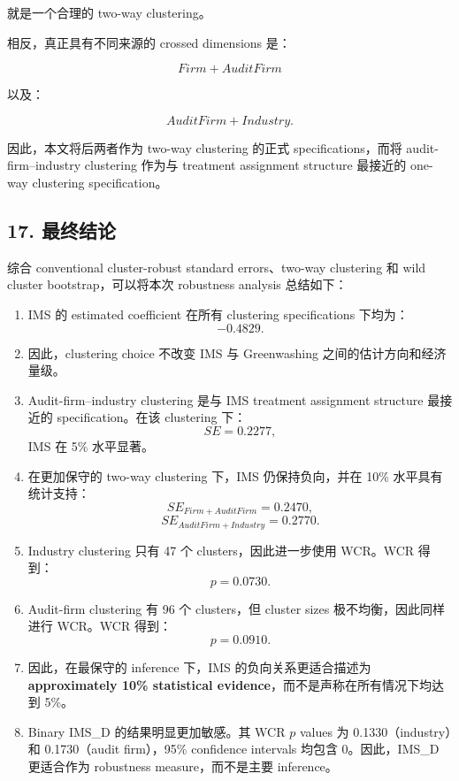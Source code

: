 \documentclass[11pt]{article}
\begin{document}
就是一个合理的 two-way clustering。

相反，真正具有不同来源的 crossed dimensions 是：

\[
Firm + AuditFirm
\]

以及：

\[
AuditFirm + Industry.
\]

因此，本文将后两者作为 two-way clustering 的正式 specifications，而将 audit-firm--industry clustering 作为与 treatment assignment structure 最接近的 one-way clustering specification。

\subsection{17. 最终结论}

综合 conventional cluster-robust standard errors、two-way clustering 和 wild cluster bootstrap，可以将本次 robustness analysis 总结如下：

\begin{enumerate}
    \item IMS 的 estimated coefficient 在所有 clustering specifications 下均为：
    \[
    -0.4829.
    \]

    \item 因此，clustering choice 不改变 IMS 与 Greenwashing 之间的估计方向和经济量级。

    \item Audit-firm--industry clustering 是与 IMS treatment assignment structure 最接近的 specification。在该 clustering 下：
    \[
    SE=0.2277,
    \]
    IMS 在 5\% 水平显著。

    \item 在更加保守的 two-way clustering 下，IMS 仍保持负向，并在 10\% 水平具有统计支持：
    \[
    SE_{Firm+AuditFirm}=0.2470,
    \]
    \[
    SE_{AuditFirm+Industry}=0.2770.
    \]

    \item Industry clustering 只有 47 个 clusters，因此进一步使用 WCR。WCR 得到：
    \[
    p=0.0730.
    \]

    \item Audit-firm clustering 有 96 个 clusters，但 cluster sizes 极不均衡，因此同样进行 WCR。WCR 得到：
    \[
    p=0.0910.
    \]

    \item 因此，在最保守的 inference 下，IMS 的负向关系更适合描述为\textbf{approximately 10\% statistical evidence}，而不是声称在所有情况下均达到 5\%。

    \item Binary IMS\_D 的结果明显更加敏感。其 WCR $p$ values 为 0.1330（industry）和 0.1730（audit firm），95\% confidence intervals 均包含 0。因此，IMS\_D 更适合作为 robustness measure，而不是主要 inference。
\end{enumerate}
\end{document}
